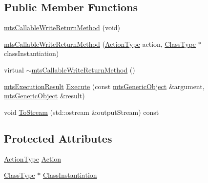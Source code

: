 \subsection*{Public Member Functions}
\begin{DoxyCompactItemize}
\item 
\hyperlink{classmts_callable_write_return_method_a772c565f1a82229cbf1be0cd257ddd98}{mts\-Callable\-Write\-Return\-Method} (void)
\item 
\hyperlink{classmts_callable_write_return_method_ab131f7ec5ecbf8b49fa51a7e09163b6b}{mts\-Callable\-Write\-Return\-Method} (\hyperlink{classmts_callable_write_return_method_a0b5f9726e52abdb0790ccd8c217591b2}{Action\-Type} action, \hyperlink{classmts_callable_write_return_method_a51dbe6298941ab172d83182c8188092d}{Class\-Type} $\ast$class\-Instantiation)
\item 
virtual \hyperlink{classmts_callable_write_return_method_a894a51147b26a6b6da76ffd32730d383}{$\sim$mts\-Callable\-Write\-Return\-Method} ()
\item 
\hyperlink{classmts_execution_result}{mts\-Execution\-Result} \hyperlink{classmts_callable_write_return_method_a18090c504b35a9f4142fd1f64365a1db}{Execute} (const \hyperlink{classmts_generic_object}{mts\-Generic\-Object} \&argument, \hyperlink{classmts_generic_object}{mts\-Generic\-Object} \&result)
\item 
void \hyperlink{classmts_callable_write_return_method_a5b79eed629e5634a62de1a6056571686}{To\-Stream} (std\-::ostream \&output\-Stream) const 
\end{DoxyCompactItemize}
\subsection*{Protected Attributes}
\begin{DoxyCompactItemize}
\item 
\hyperlink{classmts_callable_write_return_method_a0b5f9726e52abdb0790ccd8c217591b2}{Action\-Type} \hyperlink{classmts_callable_write_return_method_a3602dcc1749010bd68b5797ea137fd44}{Action}
\item 
\hyperlink{classmts_callable_write_return_method_a51dbe6298941ab172d83182c8188092d}{Class\-Type} $\ast$ \hyperlink{classmts_callable_write_return_method_abf8e145001a1e02c63a7cc66ee87f066}{Class\-Instantiation}
\end{DoxyCompactItemize}


